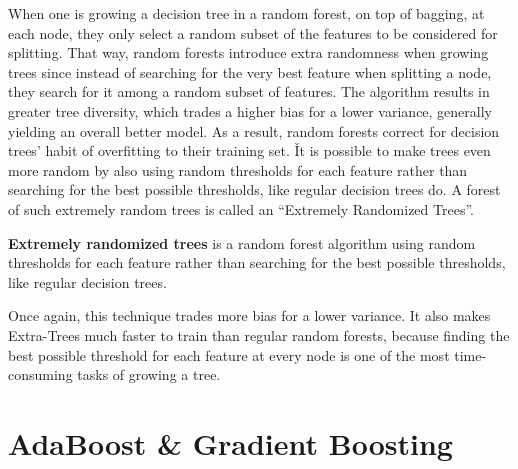 When one is growing a decision tree in a random forest, on top of bagging, at each node, they only select a random
subset of the features to be considered for splitting. That way, random forests introduce extra randomness when
growing trees since instead of searching for the very best feature when splitting a node, they search for it among a
random subset of features. The algorithm results in greater tree diversity, which trades a higher bias for a lower
variance, generally yielding an overall better model. As a result, random forests correct for decision trees' habit
of overfitting to their training set. \v

It is possible to make trees even more random by also using random thresholds for each feature rather than searching
for the best possible thresholds, like regular decision trees do. A forest of such extremely random trees is called
an ``Extremely Randomized Trees''.

\textbf{Extremely randomized trees} is a random forest algorithm using random thresholds for each feature rather than
searching for the best possible thresholds, like regular decision trees.
\ed

Once again, this technique trades more bias for a lower variance. It also makes Extra-Trees much faster to train
than regular random forests, because finding the best possible threshold for each feature at every node is one of
the most time-consuming tasks of growing a tree.

\section{AdaBoost \& Gradient Boosting}